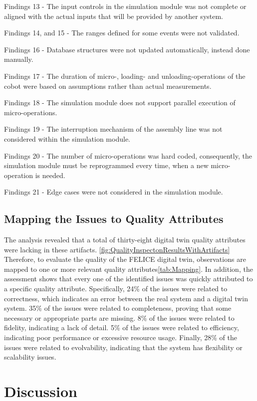 \documentclass{llncs}
\begin{document}
    Findings 13 - The input controls in the simulation module was not complete or aligned with the actual inputs that will be provided by another system. 

    Findings 14, and 15 - The ranges defined for some events were not validated. 

    Findings 16 - Database structures were not updated automatically, instead done manually.

    Findings 17 - The duration of micro-, loading- and unloading-operations of the cobot were based on assumptions rather than actual measurements.

    Findings 18 - The simulation module does not support parallel execution of micro-operations. 

    Findings 19 - The interruption mechanism of the assembly line was not considered within the simulation module. 

    Findings 20 - The number of micro-operations was hard coded, consequently, the simulation module must be reprogrammed every time, when a new micro-operation is needed. 

    Findings 21 - Edge cases were not considered in the simulation module.  


    \subsection{Mapping the Issues to Quality Attributes}
    The analysis revealed that a total of thirty-eight digital twin quality attributes were lacking in these artifacts. \ref{fig:QualityInspectonResultsWithArtifacts}
    Therefore, to evaluate the quality of the FELICE digital twin, observations are mapped to one or more relevant quality attributes\ref{tab:Mapping}.
    In addition, the assessment shows that every one of the identified issues was quickly attributed to a specific quality attribute.  
    Specifically, 24\% of the issues were related to correctness, which indicates an error between the real system and a digital twin system.
    35\% of the issues were related to completeness, proving that some necessary or appropriate parts are missing.
    8\% of the issues were related to fidelity, indicating a lack of detail. 5\% of the issues were related to efficiency, indicating poor 
    performance or excessive resource usage. Finally, 28\% of the issues were related to evolvability, indicating that the system has flexibility or scalability issues.  

    \section{Discussion}
\end{document}
